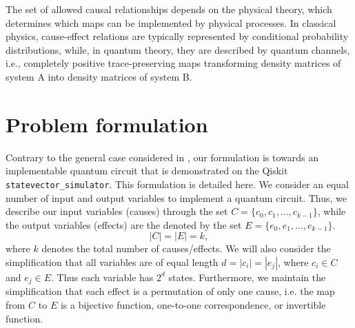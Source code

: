 The set of allowed causal relationships depends on the physical theory, which determines which maps can be implemented by physical processes.
In classical physics, cause-effect relations are typically represented by conditional probability distributions, while, in quantum theory, they are described by quantum channels, i.e., completely positive trace-preserving maps transforming density matrices of system A into density matrices of system B.



\section{Problem formulation}\label{sec:prob-formulation}
Contrary to the general case considered in \cite{chiribella2019quantum}, our formulation is towards an implementable quantum circuit that is demonstrated on the Qiskit \texttt{statevector\_simulator}. 
This formulation is detailed here. We consider an equal number of input and output variables to implement a quantum circuit. 
Thus, we describe our input variables (causes) through the set $C = \{c_0, c_1,\dots, c_{k-1}\}$, while the output variables (effects) are the denoted by the set $E = \{e_0, e_1,\dots, e_{k-1}\}$.
\begin{equation}
|C| = |E| = k,
\end{equation}
where $k$ denotes the total number of causes/effects. We will also consider the simplification that all variables are of equal length $d = |c_i| = |e_j|$, where $c_i \in C$ and $e_j \in E$.
Thus each variable has $2^d$ states. Furthermore, we maintain the simplification that each effect is a permutation of only one cause, i.e. the map from $C$ to $E$ is a bijective function, one-to-one correspondence, or invertible function.

